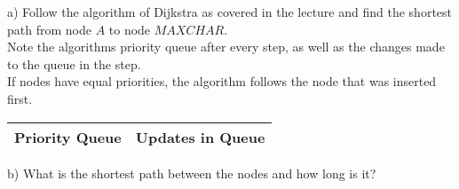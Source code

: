 a) Follow the algorithm of Dijkstra as covered in the lecture and find the shortest path from node $A$ to node $MAXCHAR$.\\
Note the algorithms priority queue after every step, as well as the changes made to the queue in the step.\\
If nodes have equal priorities, the algorithm follows the node that was inserted first.\\
\newpage
\begin{center}
    \begin{tabular}{|P{8cm}|P{6cm}|}
        \hline
        Priority Queue & Updates in Queue\\
        \hline
        \hline
    \end{tabular}
\end{center}
b) What is the shortest path between the nodes and how long is it?\\
\newline
\noindent{}
